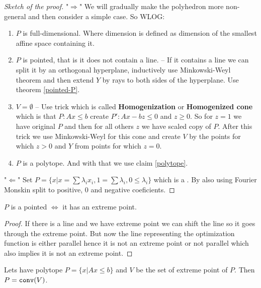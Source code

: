 \begin{proof}[Sketch of the proof]
	"$\Rightarrow$" We will gradually make the polyhedron more non-general and then consider a simple case. So WLOG:

	\begin{enumerate}
		\item $P$ is full-dimensional. Where dimension is defined as dimension of the smallest affine space containing it.
		\item $P$ is pointed, that is it does not contain a line. -- If it contains a line we can split it by an orthogonal hyperplane, inductively use Minkowski-Weyl theorem and then extend $Y$ by rays to both sides of the hyperplane. Use theorem \ref{pointed-P}.
		\item $V = \emptyset$ -- Use trick which is called \textbf{Homogenization} or \textbf{Homogenized cone} which is that $P : Ax \leq b$ create $P' : Ax - bz \leq 0$ and $z \geq 0$. So for $z = 1$ we have original $P$ and then for all others $z$ we have scaled copy of $P$. After this trick we use Minkowski-Weyl for this cone and create $V$ by the points for which $z > 0$ and $Y$ from points for which $z = 0$.
		\item $P$ is a polytope. And with that we use claim \ref{polytope}.
	\end{enumerate}

	"$\Leftarrow$" Set $P = \{x | x = \sum \lambda_{i} x_{i}, 1 = \sum \lambda_{i}, 0 \leq \lambda_{i}\}$ which is a . By also using Fourier Monskin split to positive, 0 and negative coeficients.
\end{proof}

\begin{thm}
	$P$ is a pointed $\iff$ it has an extreme point.
	\label{pointed-P}
\end{thm}

\begin{proof}
	If there is a line and we have extreme point we can shift the line so it goes through the extreme point. But now the line representing the optimization function is either parallel hence it is not an extreme point or not parallel which also implies it is not an extreme point.
\end{proof}

\begin{claim}
Lets have polytope $P = \{x | A x \leq b\}$ and $V$ be the set of extreme point of $P$. Then $P = \mathtt{conv}(V)$.
	\label{polytope}
\end{claim}

